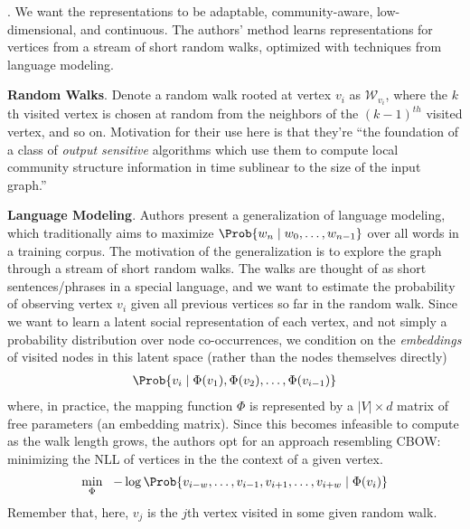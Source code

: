 \documentclass[11pt]{article}
\begin{document}
\myspace
\p {}. We want the representations to be adaptable, community-aware, low-dimensional, and continuous. The authors' method learns representations for vertices from a stream of short random walks, optimized with techniques from language modeling.
\begin{compactitem}
	\item \textbf{Random Walks}. Denote a random walk rooted at vertex $v_i$ as $\mathcal{W}_{v_i}$, where the $k$th visited vertex is chosen at random from the neighbors of the $(k-1)^{th}$ visited vertex, and so on. Motivation for their use here is that they're ``the foundation of a class of \textit{output sensitive} algorithms which use them to compute local community structure information in time sublinear to the size of the input graph.''
	
	\item \textbf{Language Modeling}. Authors present a generalization of language modeling, which traditionally aims to maximize $\Prob{w_n \mid w_0, \ldots, w_{n-1}}$ over all words in a training corpus. The motivation of the generalization is to explore the graph through a stream of short random walks. The walks are thought of as short sentences/phrases in a special language, and we want to estimate the probability of observing vertex $v_i$ given all previous vertices so far in the random walk. Since we want to learn a latent social representation of each vertex, and not simply a probability distribution over node co-occurrences, we condition on the \textit{embeddings} of visited nodes in this latent space (rather than the nodes themselves directly)
	\begin{align}
	\Prob{v_i \mid \Phi(v_1), \Phi(v_2), \ldots, \Phi(v_{i - 1})} 
	\end{align}
	where, in practice, the mapping function $\Phi$ is represented by a $|V| \times d$ matrix of free parameters (an embedding matrix). Since this becomes infeasible to compute as the walk length grows, the authors opt for an approach resembling CBOW: minimizing the NLL of vertices in the the context of a given vertex.
	\begin{align}
	\min_{\Phi}~~ - \log \Prob{v_{i-w}, \ldots, v_{i-1}, v_{i+1}, \ldots, v_{i+w} \mid \Phi(v_i) }
	\end{align}
	Remember that, here, $v_j$ is the $j$th vertex visited in some given random walk. 
\end{compactitem}
\end{document}
